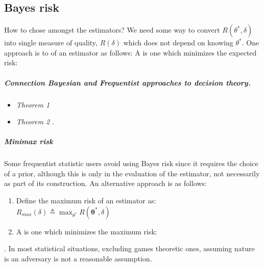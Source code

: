 \subsection{Bayes risk}
How to chose amongst the estimators? 
We need some way to convert $R(\theta^{*}, \delta)$ into single measure of quality, $R(
\delta)$ which does not depend on knowing $\theta^{*}$. One approach is to   of an estimator as follows:
A  is one which minimizes the
expected risk: 

\subparagraph{Connection Bayesian and Frequentist approaches to decision theory.}
\begin{itemize}
    \item \emph{Theorem 1} 
    \item \emph{Theorem 2} .
\end{itemize}

\subparagraph{Minimax risk}
Some frequentist statistic users avoid using Bayes risk since it requires the choice of
a prior, although this is only in the evaluation of the estimator, not necessarily as 
part of its construction. An alternative approach is as follows:
\begin{enumerate}
    \item Define the  maximum risk of an estimator as:\\
        $R_{max}(\delta) \triangleq \displaystyle\max_{\theta^{*}}R(\bm{\theta}^{*},
        \delta)$
    \item A  is one which minimizes the maximum risk:
\end{enumerate}
.
In most statistical situations, excluding games theoretic ones, assuming nature is an
adversary is not a reasonable assumption.


